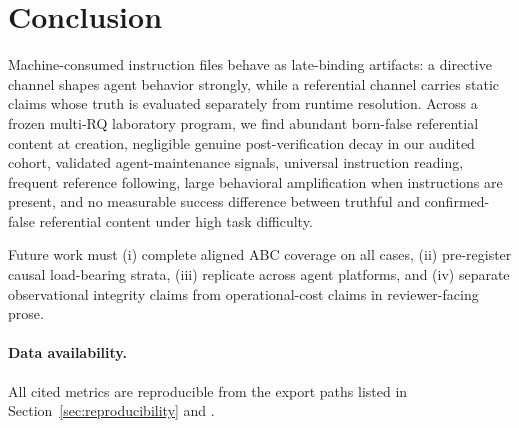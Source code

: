 \section{Conclusion}
\label{sec:conclusion}

Machine-consumed instruction files behave as late-binding artifacts: a directive channel shapes agent behavior strongly, while a referential channel carries static claims whose truth is evaluated separately from runtime resolution.
Across a frozen multi-RQ laboratory program, we find abundant born-false referential content at creation, negligible genuine post-verification decay in our audited cohort, validated agent-maintenance signals, universal instruction reading, frequent reference following, large behavioral amplification when instructions are present, and no measurable success difference between truthful and confirmed-false referential content under high task difficulty.

Future work must (i) complete aligned ABC coverage on all cases, (ii) pre-register causal load-bearing strata, (iii) replicate across agent platforms, and (iv) separate observational integrity claims from operational-cost claims in reviewer-facing prose.

\paragraph{Data availability.}
All cited metrics are reproducible from the export paths listed in Section~\ref{sec:reproducibility} and .
